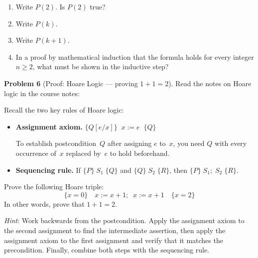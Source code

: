 \documentclass[11pt]{article}
\begin{document}
\begin{enumerate}[label=\textbf{\alph*.},itemsep=4pt]
  \item Write $P(2)$.  Is $P(2)$ true?
  \item Write $P(k)$.
  \item Write $P(k+1)$.
  \item In a proof by mathematical induction that the formula
        holds for every integer $n \ge 2$, what must be shown
        in the inductive step?
\end{enumerate}

\bigskip

\noindent\textbf{Problem 6} (Proof: Hoare Logic --- proving $1 + 1 = 2$). \;
Read the notes on Hoare logic in the course notes:

\noindent
Recall the two key rules of Hoare logic:

\begin{itemize}[itemsep=4pt]
  \item \textbf{Assignment axiom.}\;
        $\{Q[e/x]\} \;\; x := e \;\; \{Q\}$

        To establish postcondition~$Q$ after assigning $e$
        to~$x$, you need $Q$ with every occurrence
        of~$x$ replaced by~$e$ to hold beforehand.

  \item \textbf{Sequencing rule.}\;
        If \;$\{P\}\; S_1 \;\{Q\}$\; and
        \;$\{Q\}\; S_2 \;\{R\}$,\;
        then \;$\{P\}\; S_1;\; S_2 \;\{R\}$.
\end{itemize}

\noindent
Prove the following Hoare triple:
\[
  \{x = 0\} \quad
  x := x + 1;\;\; x := x + 1
  \quad \{x = 2\}
\]
In other words, prove that $1 + 1 = 2$.

\medskip\noindent
\emph{Hint}: Work backwards from the postcondition.  Apply
the assignment axiom to the second assignment to find the
intermediate assertion, then apply the assignment axiom to
the first assignment and verify that it matches the
precondition.  Finally, combine both steps with the
sequencing rule.
\end{document}
